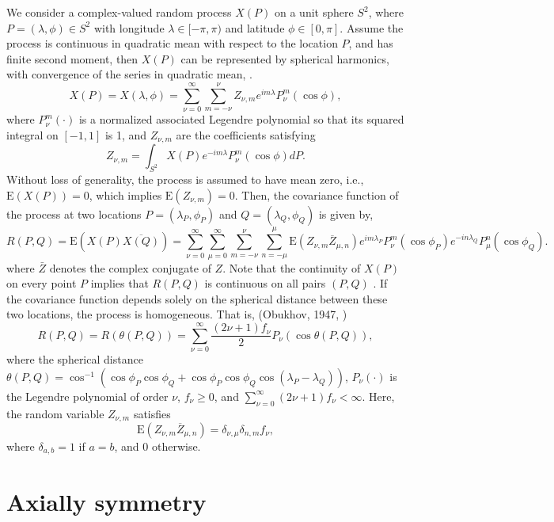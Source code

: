 We consider a complex-valued random process $X(P)$ on a unit sphere $S^2$, where $P=(\lambda, \phi) \in S^2$ with longitude $\lambda \in [-\pi, \pi)$ and latitude $\phi \in [0, \pi]$. Assume the process is continuous in quadratic mean with respect to the location $P$, and has finite second moment, then $X(P)$ can be represented by spherical harmonics, with convergence of the series in quadratic mean, \cite{LiNorth1997}.
	\[
		X(P) = X(\lambda,\phi) = \sum_{\nu=0}^\infty \sum_{m=-\nu}^{\nu} Z_{\nu,m} e^{i m \lambda} P_{\nu}^m (\cos \phi),
	\]
	where $P_{\nu}^m(\cdot)$ is a normalized associated Legendre polynomial so that its squared integral on $[-1, 1]$ is 1, and $Z_{\nu,m}$ are the coefficients satisfying
	\[
		Z_{\nu,m} = \int_{S^2} X(P) e^{-im \lambda} P_{\nu}^m (\cos \phi) d P.
	\]
	Without loss of generality, the process is assumed to have mean zero, i.e., $\mbox{E}(X(P)) = 0$, which implies $\mbox{E} (Z_{\nu,m}) = 0$. Then, the covariance function of the process at two locations $P = (\lambda_P, \phi_P)$ and $Q=(\lambda_Q, \phi_Q)$ is given by,
	\[
		R(P, Q) = \mbox{E}(X(P) \overline{X(Q)}) = \sum_{\nu=0}^\infty \sum_{\mu=0}^\infty \sum_{m=-\nu}^{\nu} \sum_{n=-\mu}^{\mu} \mbox{E}(Z_{\nu,m} \overline{Z}_{\mu,n}) e^{im \lambda_P} P_{\nu}^m(\cos \phi_P) e^{-i n \lambda_Q} P_{\mu}^n (\cos \phi_Q).
	\]
	where $\bar{Z}$ denotes the complex conjugate of $Z$. Note that the continuity of $X(P)$ on every point $P$ implies that $R(P, Q)$ is continuous on all pairs $(P, Q)$ \cite[page 83]{Leadbetter1967}. If the covariance function depends solely on the spherical distance between these two locations, the process is homogeneous. That is, (Obukhov, 1947, \cite{Yaglomothers1961})
	\[
		R(P, Q) = R(\theta(P,Q)) = \sum_{\nu=0}^\infty \frac{(2\nu+1)f_{\nu}}{2} P_{\nu}(\cos \theta(P,Q)),
	\]
	where the spherical distance $ \theta(P,Q) = \cos^{-1} (\cos \phi_P \cos \phi_Q + \cos \phi_P \cos \phi_Q \cos (\lambda_P-\lambda_Q))$, $P_{\nu}(\cdot)$ is the Legendre polynomial of order $\nu$, $f_{\nu} \ge 0$, and $\sum_{\nu = 0}^{\infty} (2\nu+1)f_{\nu} < \infty$. Here, the random variable $Z_{\nu,m}$ satisfies
	\[
		\mbox{E} (Z_{\nu,m} \overline{Z}_{\mu,n}) = \delta_{\nu,\mu} \delta_{n,m} f_\nu,
	\]
	where $\delta_{a, b} = 1$ if $a = b$, and $0$ otherwise.
	
	
	\section{Axially symmetry}
	
